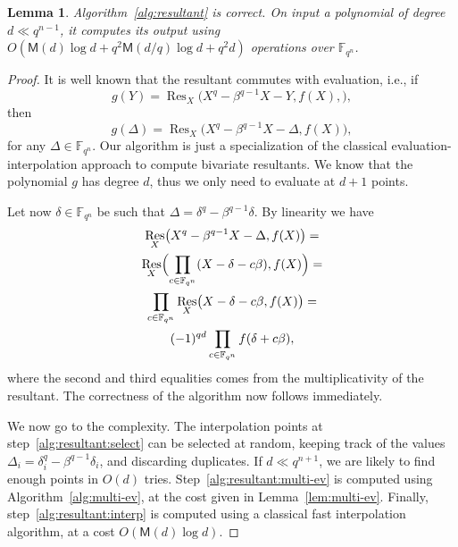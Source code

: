 \documentclass{sig-alternate}
\newcommand{\ff}[1]{\mathbb{F}_{#1}}
\newcommand{\dd}{d}
\newcommand{\qq}{q}
\newcommand{\nn}{n}
\newcommand{\qn}{{\qq^\nn}}
\newcommand{\extf}{\ff{\qn}}
\newcommand{\Mul}{\mathsf{M}}
\DeclareMathOperator{\Res}{Res}
\newcounter{algo}
\newtheorem{Lem}{Lemma}
\begin{document}
\begin{Lem}
  \label{lem:alg-resultant}
  Algorithm~\ref{alg:resultant} is correct. On input a polynomial of
  degree $d\ll\qq^{\nn-1}$, it computes its output using $O(\Mul(\dd)
  \log\dd + \qq^2\Mul(\dd/\qq)\log\dd + \qq^2\dd)$ operations over
  $\extf$.
\end{Lem}
\begin{proof}
  It is well known that the resultant commutes with evaluation, i.e., if
  \begin{equation}
    g(Y) = \Res_X\bigl(X^\qq-\beta^{\qq-1}X-Y,f(X),\bigr),
  \end{equation}
  then
  \begin{equation}
    g(\Delta) = \Res_X\bigl(X^\qq - \beta^{\qq-1}X -\Delta , f(X)\bigr),
  \end{equation}
  for any $\Delta\in\extf$. Our algorithm is just a specialization of
  the classical evaluation-interpolation approach to compute bivariate
  resultants. We know that the polynomial $g$ has degree $\dd$, thus
  we only need to evaluate at $d+1$ points.

  Let now $\delta\in\extf$ be such that
  $\Delta=\delta^\qq-\beta^{\qq-1}\delta$. By linearity we have
  \begin{multline}
    \label{eq:lin-resultant}
    \Res_X\bigl(X^\qq-\beta^{\qq-1}X-\Delta,f(X)\bigr) =\\
    \Res_X\Bigl(  \prod_{c\in\extf}(X-\delta - c\beta),f(X) \Bigr) =\\
    \prod_{c\in\extf} \Res_X\bigl(X-\delta - c\beta, f(X)\bigr) =\\
    (-1)^{\qq\dd} \prod_{c\in\extf} f(\delta+c\beta),
  \end{multline}
  where the second and third equalities comes from the
  multiplicativity of the resultant. The correctness of the algorithm
  now follows immediately.

  We now go to the complexity. The interpolation points at
  step~\ref{alg:resultant:select} can be selected at random, keeping
  track of the values $\Delta_i=\delta_i^\qq-\beta^{\qq-1}\delta_i$,
  and discarding duplicates. If $\dd\ll\qq^{n+1}$, we are likely to
  find enough points in $O(d)$
  tries. Step~\ref{alg:resultant:multi-ev} is computed using
  Algorithm~\ref{alg:multi-ev}, at the cost given in
  Lemma~\ref{lem:multi-ev}. Finally, step~\ref{alg:resultant:interp}
  is computed using a classical fast interpolation algorithm, at a
  cost $O(\Mul(d)\log d)$.
\end{proof}
\end{document}
